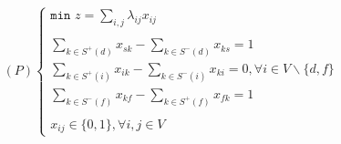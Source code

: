 \documentclass{article}
\begin{document}
\begin{equation}
    \label{pl-P}
    (P)\begin{cases}
        \texttt{min } z = \sum_{i,j}\lambda_{ij}x_{ij} \\ \\

        \sum_{k\in S^+(d)}x_{sk} - \sum_{k\in S^-(d)}x_{ks} = 1\\
        \sum_{k\in S^+(i)}x_{ik} - \sum_{k\in S^-(i)}x_{ki} = 0, \forall i \in V \backslash \{d, f\}\\
        \sum_{k\in S^-(f)}x_{kf} - \sum_{k\in S^+(f)}x_{fk} = 1 \\ \\

        x_{ij} \in \{0, 1\}, \forall i, j \in V
    \end{cases}
\end{equation}
\end{document}
